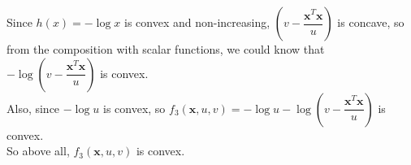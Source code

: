 \documentclass[10pt]{article}
\renewcommand{\mathbf}{\boldsymbol}
\begin{document}
\begin{enumerate}
Since $h(x)=-\log x$ is convex and non-increasing, $\left(v-\dfrac{\mathbf{x}^T\mathbf{x}}{u}\right)$ is concave, so from the composition with scalar functions, we could know that
$-\log \left(v-\dfrac{\mathbf{x}^T\mathbf{x}}{u}\right)$ is convex.\\

Also, since $-\log u$ is convex, so $f_3(\mathbf{x}, u, v)=-\log u-\log \left(v-\dfrac{\mathbf{x}^T\mathbf{x}}{u}\right)$ is convex.\\

So above all, $f_3(\mathbf{x}, u, v)$ is convex.\\

\end{enumerate}
\end{document}
